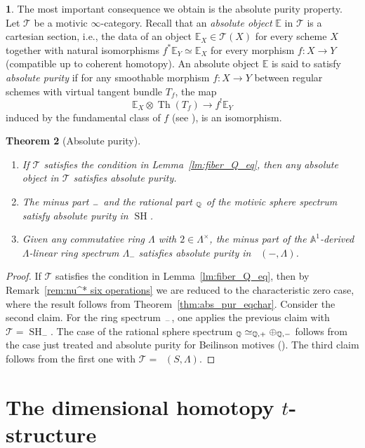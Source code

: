 \documentclass[11pt]{article}
\makeatletter
\newcommand{\ie}{i.e.,\xspace}
\newcommand{\skpt}{\smallskip}
\numberwithin{equation}{section}\renewcommand{\encodingdefault}{TU}
\newcommand{\tstructure}{$t$-structure\xspace}
\DeclareRobustCommand{\mathbbm}[1]{\csname jepbb@#1\endcsname}
\newcommand{\T}{\mathscr T}
\renewcommand{\AA}{\mathbb A}
\newcommand{\E}{\mathbb E}
\newcommand{\un}{\mathbbm 1}
\DeclareMathOperator{\SH}{SH}
\DeclareMathOperator{\DA}{D_{\AA^1}}
\DeclareMathOperator{\Th}{Th}
\newcommand{\QQ} {\mathbb Q}
\newtheorem{thm}{Theorem}[section]
\theoremstyle{remark}
\theoremstyle{definition}
\newtheorem{num}[thm]{}
\numberwithin{equation}{thm}
\makeatother
\begin{document}
\begin{num}
\label{num:abs_pur_def}
The most important consequence we obtain is the absolute purity property. Let $\T$ be a motivic $\infty$-category. Recall that an \emph{absolute object} $\E$ in $\T$ is a cartesian section, \ie the data of an object $\E_X\in\T(X)$ for every scheme $X$ together with natural isomorphisms $f^*\E_Y\simeq \E_X$ for every morphism $f:X\to Y$ (compatible up to coherent homotopy). An absolute object $\E$ is said to satisfy \emph{absolute purity} if for any smoothable morphism $f : X \to Y$ between regular schemes with virtual tangent bundle $T_f$, the map
\[
\E_X\otimes\Th(T_f)\to f^!\E_Y
\]
induced by the fundamental class of $f$ (see \cite[Def.\,4.3.7]{DJK}), is an isomorphism.
\end{num}
\skpt
\begin{thm}[Absolute purity]
\label{thm:absolute_purity}
\begin{enumerate}
\item If $\T$ satisfies the condition in Lemma~\ref{lm:fiber_Q_eq}, then any absolute object in $\T$ satisfies absolute purity.
\item The minus part $\un_-$ and the rational part $\un_\QQ$ of the motivic sphere spectrum
satisfy absolute purity in $\SH$.
\item Given any commutative ring $\Lambda$ with $2 \in \Lambda^\times$,
the minus part of the $\AA^1$-derived $\Lambda$-linear ring spectrum $\Lambda_{-}$
satisfies absolute purity in $\DA(-,\Lambda)$.
\end{enumerate}
\end{thm}
\begin{proof}
If $\T$ satisfies the condition in Lemma~\ref{lm:fiber_Q_eq}, then by Remark~\ref{rem:nu^* six operations} we are redu\-ced to the characteristic zero case, where the result follows from Theorem~\ref{thm:abs_pur_eqchar}.
Consider the second claim. For the ring spectrum $\un_-$, one applies the previous claim with $\T=\SH_-$.
The case of the rational sphere spectrum $\un_\QQ \simeq \un_{\QQ,+}\oplus\un_{\QQ,-}$ follows from the case just treated and absolute purity for Beilinson motives (\cite[Th.\,14.4.1]{CD3}).
The third claim follows from the first one with $\T=\DA(S,\Lambda)$.
\end{proof}

\section{The dimensional homotopy \texorpdfstring{\tstructure}{tstructure}}
\label{sec:t-structure}
\end{document}
